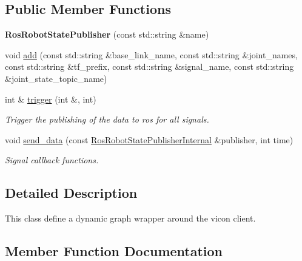 \subsection*{Public Member Functions}
\begin{DoxyCompactItemize}
\item 
{\bfseries Ros\+Robot\+State\+Publisher} (const std\+::string \&name)\hypertarget{classdynamic__graph_1_1RosRobotStatePublisher_a7dbda339acfbacd6c2f45e7aac4409be}{}\label{classdynamic__graph_1_1RosRobotStatePublisher_a7dbda339acfbacd6c2f45e7aac4409be}

\item 
void \hyperlink{classdynamic__graph_1_1RosRobotStatePublisher_a92094934e53306e73b6fc13d1de61b3d}{add} (const std\+::string \&base\+\_\+link\+\_\+name, const std\+::string \&joint\+\_\+names, const std\+::string \&tf\+\_\+prefix, const std\+::string \&signal\+\_\+name, const std\+::string \&joint\+\_\+state\+\_\+topic\+\_\+name)
\item 
int \& \hyperlink{classdynamic__graph_1_1RosRobotStatePublisher_a4d66defbd1b308cd06394107f55f6cbb}{trigger} (int \&, int)
\begin{DoxyCompactList}\small\item\em Trigger the publishing of the data to ros for all signals. \end{DoxyCompactList}\item 
void \hyperlink{classdynamic__graph_1_1RosRobotStatePublisher_a196621509ce1e5becada60a7093bcb3a}{send\+\_\+data} (const \hyperlink{structdynamic__graph_1_1RosRobotStatePublisherInternal}{Ros\+Robot\+State\+Publisher\+Internal} \&publisher, int time)\hypertarget{classdynamic__graph_1_1RosRobotStatePublisher_a196621509ce1e5becada60a7093bcb3a}{}\label{classdynamic__graph_1_1RosRobotStatePublisher_a196621509ce1e5becada60a7093bcb3a}

\begin{DoxyCompactList}\small\item\em Signal callback functions. \end{DoxyCompactList}\end{DoxyCompactItemize}


\subsection{Detailed Description}
This class define a dynamic graph wrapper around the vicon client. 

\subsection{Member Function Documentation}
